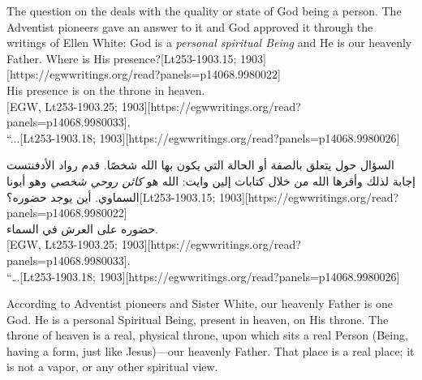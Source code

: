 {The question on the  deals with the quality or state of God being a person. The Adventist pioneers gave an answer to it and God approved it through the writings of Ellen White: God is a \textit{personal spiritual Being} and He is our heavenly Father. Where is His presence?[Lt253-1903.15; 1903][https://egwwritings.org/read?panels=p14068.9980022] \\
His presence is on the throne in heaven. \\
[EGW, Lt253-1903.25; 1903][https://egwwritings.org/read?panels=p14068.9980033]. \\
“...[Lt253-1903.18; 1903][https://egwwritings.org/read?panels=p14068.9980026]


السؤال حول  يتعلق بالصفة أو الحالة التي يكون بها الله شخصًا. قدم رواد الأدفنتست إجابة لذلك وأقرها الله من خلال كتابات إلين وايت: الله هو \textit{كائن روحي شخصي} وهو أبونا السماوي. أين يوجد حضوره؟[Lt253-1903.15; 1903][https://egwwritings.org/read?panels=p14068.9980022] \\
حضوره على العرش في السماء. \\
[EGW, Lt253-1903.25; 1903][https://egwwritings.org/read?panels=p14068.9980033]. \\
“...[Lt253-1903.18; 1903][https://egwwritings.org/read?panels=p14068.9980026]


According to Adventist pioneers and Sister White, our heavenly Father is one God. He is a personal Spiritual Being, present in heaven, on His throne. The throne of heaven is a real, physical throne, upon which sits a real Person (Being, having a form, just like Jesus)—our heavenly Father. That place is a real place; it is not a vapor, or any other spiritual view.


}
